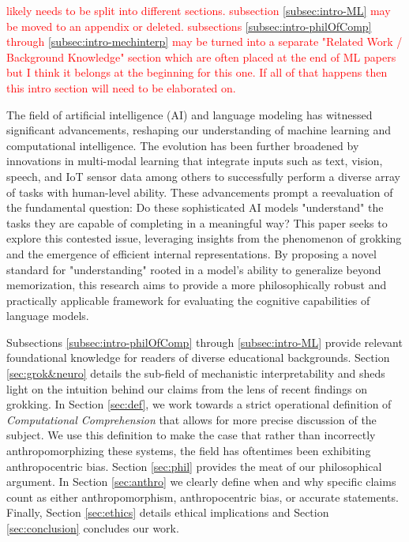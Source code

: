 \documentclass{article}
\begin{document}
\textcolor{red}{likely needs to be split into different sections. subsection \ref{subsec:intro-ML} may be moved to an appendix or deleted. subsections \ref{subsec:intro-philOfComp} through \ref{subsec:intro-mechinterp} may be turned into a separate "Related Work / Background Knowledge" section which are often placed at the end of ML papers but I think it belongs at the beginning for this one. If all of that happens then this intro section will need to be elaborated on.}\par

The field of artificial intelligence (AI) and language modeling has witnessed significant advancements, reshaping our understanding of machine learning and computational intelligence. 
The evolution has been further broadened by innovations in multi-modal learning that integrate inputs such as text, vision, speech, and IoT sensor data among others to successfully perform a diverse array of tasks with human-level ability.
These advancements prompt a reevaluation of the fundamental question: Do these sophisticated AI models "understand" the tasks they are capable of completing in a meaningful way? This paper seeks to explore this contested issue, leveraging insights from the phenomenon of grokking and the emergence of efficient internal representations. By proposing a novel standard for "understanding" rooted in a model’s ability to generalize beyond memorization, this research aims to provide a more philosophically robust and practically applicable framework for evaluating the cognitive capabilities of language models.\par

Subsections \ref{subsec:intro-philOfComp} through \ref{subsec:intro-ML} provide relevant foundational knowledge for readers of diverse educational backgrounds. 
Section \ref{sec:grok&neuro} details the sub-field of mechanistic interpretability and sheds light on the intuition behind our claims from the lens of recent findings on grokking. 
In Section \ref{sec:def}, we work towards a strict operational definition of \textit{Computational Comprehension} that allows for more precise discussion of the subject. 
We use this definition to make the case that rather than incorrectly anthropomorphizing these systems, the field has oftentimes been exhibiting anthropocentric bias. 
Section \ref{sec:phil} provides the meat of our philosophical argument.
In Section \ref{sec:anthro} we clearly define when and why specific claims count as either anthropomorphism, anthropocentric bias, or accurate statements.
Finally, Section \ref{sec:ethics} details ethical implications and Section \ref{sec:conclusion} concludes our work.
\end{document}
